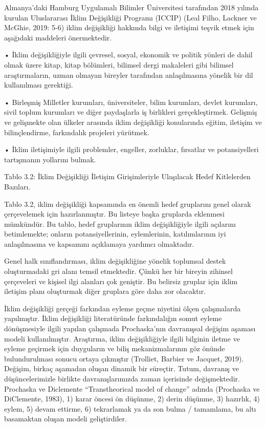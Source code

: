 \documentclass[
]{book}
\begin{document}
Almanya'daki Hamburg Uygulamalı Bilimler Üniversitesi tarafından 2018 yılında kurulan Uluslararası İklim Değişikliği Programı (ICCIP) (Leal Filho, Lackner ve McGhie, 2019: 5-6) iklim değişikliği hakkında bilgi ve iletişimi teşvik etmek için aşağıdaki maddeleri önermektedir.

• İklim değişikliğiyle ilgili çevresel, sosyal, ekonomik ve politik yönleri de dahil olmak üzere kitap, kitap bölümleri, bilimsel dergi makaleleri gibi bilimsel araştırmaların, uzman olmayan bireyler tarafından anlaşılmasına yönelik bir dil kullanılması gerektiği.

• Birleşmiş Milletler kurumları, üniversiteler, bilim kurumları, devlet kurumları, sivil toplum kurumları ve diğer paydaşlarla iş birlikleri gerçekleştirmek. Gelişmiş ve gelişmekte olan ülkeler arasında iklim değişikliği konularında eğitim, iletişim ve bilinçlendirme, farkındalık projeleri yürütmek.

• İklim iletişimiyle ilgili problemler, engeller, zorluklar, fırsatlar ve potansiyelleri tartışmanın yollarını bulmak.

Tablo 3.2: İklim Değişikliği İletişim Girişimleriyle Ulaşılacak Hedef Kitlelerden Bazıları.

Tablo 3.2, iklim değişikliği kapsamında en önemli hedef gruplarını genel olarak çerçevelemek için hazırlanmıştır. Bu listeye başka gruplarda eklenmesi mümkündür. Bu tablo, hedef gruplarının iklim değişikliğiyle ilgili açılarını betimlemekte; onların potansiyellerinin, eylemlerinin, katılımlarının iyi anlaşılmasına ve kapsamını açıklamaya yardımcı olmaktadır.

Genel halk sınıflandırması, iklim değişikliğine yönelik toplumsal destek oluşturmadaki gri alanı temsil etmektedir. Çünkü her bir bireyin zihinsel çerçeveleri ve kişisel ilgi alanları çok geniştir. Bu belirsiz gruplar için iklim iletişim planı oluşturmak diğer gruplara göre daha zor olacaktır.

İklim değişikliği gerçeği farkından eyleme geçme niyetini ölçen çalışmalarda yapılmıştır. İklim değişikliği literatüründe farkındalığın somut eyleme dönüşmesiyle ilgili yapılan çalışmada Prochaska'nın davranışsal değişim aşaması modeli kullanılmıştır. Araştırma, iklim değişikliğiyle ilgili bilginin iletme ve eyleme geçirmek için duyguların ve biliş mekanizmalarının göz önünde bulundurulması sonucu ortaya çıkmıştır (Trolliet, Barbier ve Jacquet, 2019). Değişim, birkaç aşamadan oluşan dinamik bir süreçtir. Tutum, davranış ve düşüncelerimizle birlikte davranışlarımızda zaman içerisinde değişmektedir. Prochaska ve Diclemente ``Transtheorical model of change'' adında (Prochaska ve DiClemente, 1983), 1) karar öncesi ön düşünme, 2) derin düşünme, 3) hazırlık, 4) eylem, 5) devam ettirme, 6) tekrarlamak ya da son bulma / tamamlama, bu altı basamaktan oluşan modeli geliştirdiler.
\end{document}
